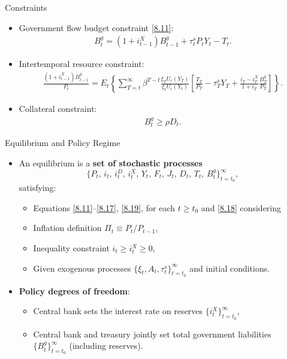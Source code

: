 \documentclass[11pt,aspectratio=169]{beamer}
\begin{document}
\begin{frame}{Constraints}
    \begin{itemize}
        \item Government flow budget constraint \eqref{8.11}: 
        \begin{align}
            B_t^g
      = (1+i_{t-1}^X) B_{t-1}^g
        + \tau_t^s P_t Y_t
        - T_t. \label{8.17}
        \end{align}
        \item Intertemporal resource constraint: 
        \begin{align}
            \frac{(1+i_{t-1}^X)B_{t-1}^g}{P_t}
      = E_t\left\{
        \sum_{T=t}^\infty
        \beta^{T-t}\frac{\xi_T U_c(Y_T)}{\xi_t U_c(Y_t)}
        \left[
          \frac{T_T}{P_T}
          - \tau_T^s Y_T
          + \frac{i_T - i_T^X}{1+i_T}\frac{B_T^g}{P_T}
        \right]
      \right\}. \label{8.18}
        \end{align}
        \item Collateral constraint:
        \begin{align}
            B_t^g \ge \rho D_t. \label{8.19}
        \end{align}
    \end{itemize}
\end{frame}

\begin{frame}{Equilibrium and Policy Regime}
\begin{itemize}
  \item An equilibrium is a \textbf{set of stochastic processes}
  \[
    \{ P_t,\, i_t,\, i_t^D,\, i_t^X,\, Y_t,\, F_t,\, J_t,\, D_t,\, T_t,\, B_t^g \}_{t=t_0}^{\infty},
  \]
  satisfying:
  \begin{itemize}
    \item Equations \eqref{8.11}--\eqref{8.17}, \eqref{8.19}, for each $t \ge t_0$ and \eqref{8.18} considering
    \item Inflation definition $\Pi_t \equiv P_t/P_{t-1}$,
    \item Inequality constraint $i_t \ge i_t^X \ge 0$,
    \item Given exogenous processes $\{\xi_t, A_t, \tau_t^s\}_{t=t_0}^{\infty}$ and initial conditions.
  \end{itemize}
  \medskip
  \item \textbf{Policy degrees of freedom}:
  \begin{itemize}
    \item Central bank sets the interest rate on reserves $\{i_t^X\}_{t=t_0}^{\infty}$,
    \item Central bank and treasury jointly set total government liabilities
    $\{B_t^g\}_{t=t_0}^{\infty}$ (including reserves).
  \end{itemize}
\end{itemize}
\end{frame}
\end{document}
